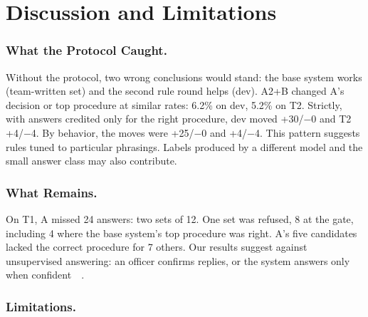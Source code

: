 \documentclass[runningheads]{llncs}
\begin{document}
\section{Discussion and Limitations}\label{sec:discussion}

\subsubsection{What the Protocol Caught.}

{Without the protocol, two wrong conclusions would stand: the base system works (team-written set) and the second rule round helps (dev). A2+B changed A's decision or top procedure at similar rates: 6.2\% on dev, 5.2\% on T2. Strictly, with answers credited only for the right procedure, dev moved +30/$-$0 and T2 +4/$-$4. By behavior, the moves were +25/$-$0 and +4/$-$4. This pattern suggests rules tuned to particular phrasings. Labels produced by a different model and the small answer class may also contribute.}

\subsubsection{What Remains.}

{On T1, A missed 24 answers: two sets of 12. One set was refused, 8 at the gate, including 4 where the base system's top procedure was right. A's five candidates lacked the correct procedure for 7 others. Our results suggest against unsupervised answering: an officer confirms replies, or the system answers only when confident~~\cite{geifman2017}.
}

\subsubsection{Limitations.}
\end{document}
